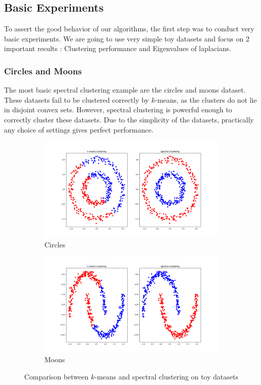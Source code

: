\documentclass[a4paper,12pt]{article}
\theoremstyle{definition}
\theoremstyle{plain}
\begin{document}
\subsection{Basic Experiments}
To assert the good behavior of our algorithms, the first step was to conduct very basic experiments. We are going to use very simple toy datasets and focus on 2 important results : Clustering performance and Eigenvalues of laplacians.
\subsubsection{Circles and Moons}
The most basic spectral clustering example are the circles and moons dataset. These datasets fail to be clustered correctly by $k$-means, as the clusters do not lie in disjoint convex sets. However, spectral clustering is powerful enough to correctly cluster these datasets.
Due to the simplicity of the datasets, practically any choice of settings gives perfect performance.
\begin{figure}[H]
	\begin{subfigure}{.6\textwidth}
		\centering
		\includegraphics[width=0.9\linewidth]{figures/Fig1}
		\caption{Circles}
	\end{subfigure}
	\begin{subfigure}{.6\textwidth}
		\centering
		\includegraphics[width=0.9\linewidth]{figures/Fig2}
		\caption{Moons}
	\end{subfigure}
	\caption{Comparison between $k$-means and spectral clustering on toy datasets}
\end{figure}
\end{document}
